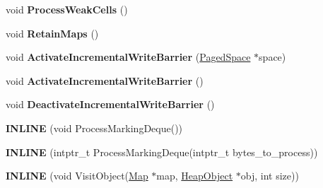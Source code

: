 \begin{DoxyCompactItemize}
\item 
void {\bfseries Process\+Weak\+Cells} ()\hypertarget{classv8_1_1internal_1_1_incremental_marking_a53993155bb852fb2787aa48e5be9626f}{}\label{classv8_1_1internal_1_1_incremental_marking_a53993155bb852fb2787aa48e5be9626f}

\item 
void {\bfseries Retain\+Maps} ()\hypertarget{classv8_1_1internal_1_1_incremental_marking_a3de860fe01450a06ef75b5babb67f6f9}{}\label{classv8_1_1internal_1_1_incremental_marking_a3de860fe01450a06ef75b5babb67f6f9}

\item 
void {\bfseries Activate\+Incremental\+Write\+Barrier} (\hyperlink{classv8_1_1internal_1_1_paged_space}{Paged\+Space} $\ast$space)\hypertarget{classv8_1_1internal_1_1_incremental_marking_a03ba35f881058dd344da108636093dce}{}\label{classv8_1_1internal_1_1_incremental_marking_a03ba35f881058dd344da108636093dce}

\item 
void {\bfseries Activate\+Incremental\+Write\+Barrier} ()\hypertarget{classv8_1_1internal_1_1_incremental_marking_a3646127f89344bdb13170518a63ee714}{}\label{classv8_1_1internal_1_1_incremental_marking_a3646127f89344bdb13170518a63ee714}

\item 
void {\bfseries Deactivate\+Incremental\+Write\+Barrier} ()\hypertarget{classv8_1_1internal_1_1_incremental_marking_aafb28534ff7c7c06a440a1d66ed03dae}{}\label{classv8_1_1internal_1_1_incremental_marking_aafb28534ff7c7c06a440a1d66ed03dae}

\item 
{\bfseries I\+N\+L\+I\+NE} (void Process\+Marking\+Deque())\hypertarget{classv8_1_1internal_1_1_incremental_marking_a8dd265b431b986696c07c0000e33d028}{}\label{classv8_1_1internal_1_1_incremental_marking_a8dd265b431b986696c07c0000e33d028}

\item 
{\bfseries I\+N\+L\+I\+NE} (intptr\+\_\+t Process\+Marking\+Deque(intptr\+\_\+t bytes\+\_\+to\+\_\+process))\hypertarget{classv8_1_1internal_1_1_incremental_marking_a1023877618da3bcbdae22ded2015b2b4}{}\label{classv8_1_1internal_1_1_incremental_marking_a1023877618da3bcbdae22ded2015b2b4}

\item 
{\bfseries I\+N\+L\+I\+NE} (void Visit\+Object(\hyperlink{classv8_1_1internal_1_1_map}{Map} $\ast$map, \hyperlink{classv8_1_1internal_1_1_heap_object}{Heap\+Object} $\ast$obj, int size))\hypertarget{classv8_1_1internal_1_1_incremental_marking_a4441a3e6a1528b3b6de8f0b8a1c71de2}{}\label{classv8_1_1internal_1_1_incremental_marking_a4441a3e6a1528b3b6de8f0b8a1c71de2}


\end{DoxyCompactItemize}
